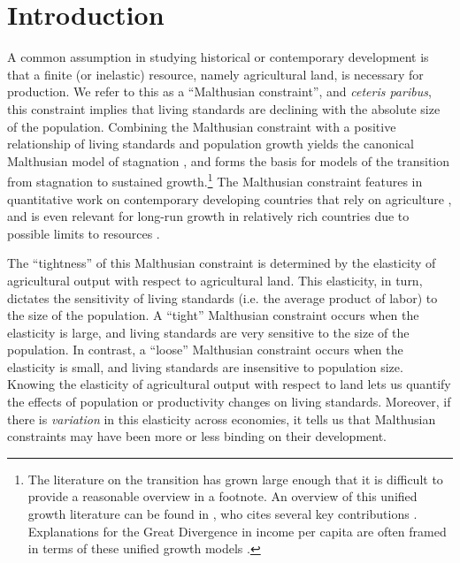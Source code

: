 \documentclass[11pt]{article}
\begin{document}
\pagebreak 

\section{Introduction}
\onehalfspacing 
A common assumption in studying historical or contemporary development is that a finite (or inelastic) resource, namely agricultural land, is necessary for production. We refer to this as a ``Malthusian constraint'', and \textit{ceteris paribus}, this constraint implies that living standards are declining with the absolute size of the population. Combining the Malthusian constraint with a positive relationship of living standards and population growth yields the canonical Malthusian model of stagnation \citep{ashraf2010dynamics}, and forms the basis for models of the transition from stagnation to sustained growth.\footnote{The literature on the transition has grown large enough that it is difficult to provide a reasonable overview in a footnote. An overview of this unified growth literature can be found in \citet{Galor:2011uq}, who cites several key contributions \citep{gw00,galor2002natural,Hansen:2002fk,doepke2004accounting,cs2005,lagerlof2006,craftsmills2009,strulik2008population}. Explanations for the Great Divergence in income per capita are often framed in terms of these unified growth models \citep{kp2001,galor2008trading,vollrath2011,vv08,vv13,cs2015}.} The Malthusian constraint features in quantitative work on contemporary developing countries that rely on agriculture \citep{Gollin:2007oq,Restuccia:2008hc,weilwilde2009,Gollin:2010ys,ev2016clim,ev2016}, and is even relevant for long-run growth in relatively rich countries due to possible limits to resources \citep{perettovalente2015}.

The ``tightness'' of this Malthusian constraint is determined by the elasticity of agricultural output with respect to agricultural land. This elasticity, in turn, dictates the sensitivity of living standards (i.e. the average product of labor) to the size of the population. A ``tight'' Malthusian constraint occurs when the elasticity is large, and living standards are very sensitive to the size of the population. In contrast, a ``loose'' Malthusian constraint occurs when the elasticity is small, and living standards are insensitive to population size. Knowing the elasticity of agricultural output with respect to land lets us quantify the effects of population or productivity changes on living standards. Moreover, if there is \textit{variation} in this elasticity across economies, it tells us that Malthusian constraints may have been more or less binding on their development.
\end{document}
